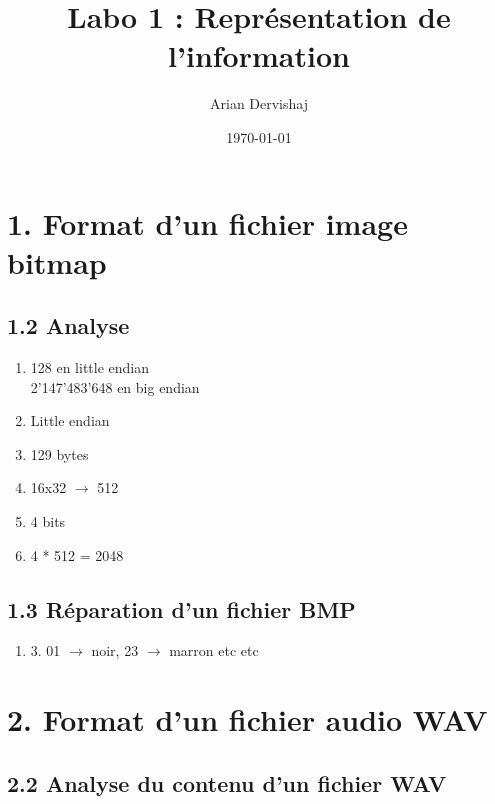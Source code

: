 \documentclass[a4paper, 12pt]{article}
\title{Labo 1 : Représentation de l'information}
\author{Arian Dervishaj}
\date{\today}
\begin{document}
\maketitle
\section*{1. Format d'un fichier image bitmap}
\subsection*{1.2 Analyse}
\begin{enumerate}
    \item 128 en little endian\\ 
          2'147'483'648 en big endian
    \item Little endian
    \item 129 bytes
    \item 16x32 $\rightarrow$ 512
    \item 4 bits
    \item 4 * 512 = 2048

\end{enumerate}

\subsection*{1.3 Réparation d'un fichier BMP}
\begin{enumerate}
  \item[] 3. 01 $\rightarrow$ noir, 23 $\rightarrow$ marron etc etc

\end{enumerate}

\section*{2. Format d'un fichier audio WAV}
\subsection*{2.2 Analyse du contenu d'un fichier WAV}
\end{document}
